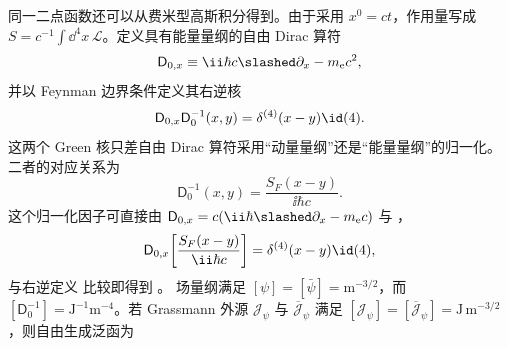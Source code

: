 同一二点函数还可以从费米型高斯积分得到。由于采用 $x^0=ct$，作用量写成 $S=c^{-1}\int\dd^4 x\,\mathcal L$。定义具有能量量纲的自由 Dirac 算符
\begin{equation}
 \mathsf D_{0,x}\equiv\ii\hbar c\slashed\partial_x-m_{\mathrm e} c^2,
 \label{eq:dirac-energy-kernel-dp42}
\end{equation}
并以 Feynman 边界条件定义其右逆核
\begin{equation}
 \mathsf D_{0,x}\mathsf D_0^{-1}(x,y)
 =\delta^{(4)}(x-y)\id(4).
 \label{eq:dirac-energy-kernel-inverse-def-dp42}
\end{equation}
这两个 Green 核只差自由 Dirac 算符采用“动量量纲”还是“能量量纲”的归一化。二者的对应关系为
\begin{equation}
 {
 \mathsf D_0^{-1}(x,y)
 =\frac{S_F(x-y)}{\ii\hbar c}.}
 \label{eq:dirac-kernel-propagator-relation-dp42}
\end{equation}
这个归一化因子可直接由
$\mathsf D_{0,x}=c(\ii\hbar\slashed\partial_x-m_{\mathrm e} c)$ 与
，
\begin{equation*}
 \mathsf D_{0,x}\!\left[\frac{S_F(x-y)}{\ii\hbar c}\right]
 =\delta^{(4)}(x-y)\id(4),
\end{equation*}
与右逆定义 比较即得到
。
场量纲满足 $[\psi]=[\bar\psi]=\mathrm{m^{-3/2}}$，而 $[\mathsf D_0^{-1}]=\mathrm{J^{-1}m^{-4}}$。若 Grassmann 外源 $\mathcal J_\psi$ 与 $\overline{\mathcal J}_\psi$ 满足 $[\mathcal J_\psi]=[\overline{\mathcal J}_\psi]=\mathrm{J\,m^{-3/2}}$，则自由生成泛函为


